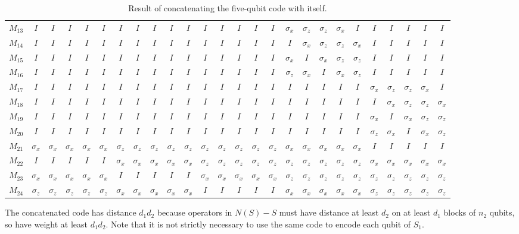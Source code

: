 \documentclass{report}
\newcommand{\X}{\sigma_x}
\newcommand{\Z}{\sigma_z}
\begin{document}
\begin{table}
{\begin{tabular}{c|ccccc|ccccc|ccccc|ccccc|ccccc}
$M_{13}$ & $I$ & $I$ & $I$ & $I$ & $I$ & $I$ & $I$ & $I$ & $I$ & $I$ & $I$ 
& $I$ & $I$ & $I$ & $I$ & $\X$ & $\Z$ & $\Z$ & $\X$ & $I$ & $I$ & $I$ & 
$I$ & $I$ & $I$ \\
$M_{14}$ & $I$ & $I$ & $I$ & $I$ & $I$ & $I$ & $I$ & $I$ & $I$ & $I$ & $I$ 
& $I$ & $I$ & $I$ & $I$ & $I$ & $\X$ & $\Z$ & $\Z$ & $\X$ & $I$ & $I$ & 
$I$ & $I$ & $I$ \\
$M_{15}$ & $I$ & $I$ & $I$ & $I$ & $I$ & $I$ & $I$ & $I$ & $I$ & $I$ & $I$ 
& $I$ & $I$ & $I$ & $I$ & $\X$ & $I$ & $\X$ & $\Z$ & $\Z$ & $I$ & $I$ & 
$I$ & $I$ & $I$ \\
$M_{16}$ & $I$ & $I$ & $I$ & $I$ & $I$ & $I$ & $I$ & $I$ & $I$ & $I$ & $I$ 
& $I$ & $I$ & $I$ & $I$ & $\Z$ & $\X$ & $I$ & $\X$ & $\Z$ & $I$ & $I$ & 
$I$ & $I$ & $I$ \\
$M_{17}$ & $I$ & $I$ & $I$ & $I$ & $I$ & $I$ & $I$ & $I$ & $I$ & $I$ & $I$ 
& $I$ & $I$ & $I$ & $I$ & $I$ & $I$ & $I$ & $I$ & $I$ & $\X$ & $\Z$ & 
$\Z$ & $\X$ & $I$ \\
$M_{18}$ & $I$ & $I$ & $I$ & $I$ & $I$ & $I$ & $I$ & $I$ & $I$ & $I$ & $I$ 
& $I$ & $I$ & $I$ & $I$ & $I$ & $I$ & $I$ & $I$ & $I$ & $I$ & $\X$ & $\Z$ 
& $\Z$ & $\X$ \\
$M_{19}$ & $I$ & $I$ & $I$ & $I$ & $I$ & $I$ & $I$ & $I$ & $I$ & $I$ & $I$ 
& $I$ & $I$ & $I$ & $I$ & $I$ & $I$ & $I$ & $I$ & $I$ & $\X$ & $I$ & 
$\X$ & $\Z$ & $\Z$ \\
$M_{20}$ & $I$ & $I$ & $I$ & $I$ & $I$ & $I$ & $I$ & $I$ & $I$ & $I$ & $I$ 
& $I$ & $I$ & $I$ & $I$ & $I$ & $I$ & $I$ & $I$ & $I$ & $\Z$ & $\X$ & $I$ 
& $\X$ & $\Z$ \\
$M_{21}$ & $\X$ & $\X$ & $\X$ & $\X$ & $\X$ & $\Z$ & $\Z$ & $\Z$ & $\Z$ 
& $\Z$ & $\Z$ & $\Z$ & $\Z$ & $\Z$ & $\Z$ & $\X$ & $\X$ & $\X$ & $\X$ & 
$\X$ & $I$ & $I$ & $I$ & $I$ & $I$ \\
$M_{22}$ & $I$ & $I$ & $I$ & $I$ & $I$ & $\X$ & $\X$ & $\X$ & $\X$ & 
$\X$ & $\Z$ & $\Z$ & $\Z$ & $\Z$ & $\Z$ & $\Z$ & $\Z$ & $\Z$ & $\Z$ & 
$\Z$ & $\X$ & $\X$ & $\X$ & $\X$ & $\X$ \\
$M_{23}$ & $\X$ & $\X$ & $\X$ & $\X$ & $\X$ & $I$ & $I$ & $I$ & $I$ & 
$I$ & $\X$ & $\X$ & $\X$ & $\X$ & $\X$ & $\Z$ & $\Z$ & $\Z$ & $\Z$ & 
$\Z$ & $\Z$ & $\Z$ & $\Z$ & $\Z$ & $\Z$ \\
$M_{24}$ & $\Z$ & $\Z$ & $\Z$ & $\Z$ & $\Z$ & $\X$ & $\X$ & $\X$ & $\X$ 
& $\X$ & $I$ & $I$ & $I$ & $I$ & $I$ & $\X$ & $\X$ & $\X$ & $\X$ & $\X$ 
& $\Z$ & $\Z$ & $\Z$ & $\Z$ & $\Z$
\end{tabular}
\caption{Result of concatenating the five-qubit code with itself.}
\label{table-25qubit}}
\end{table}
The concatenated code has distance $d_1 d_2$ because operators in $N(S) - 
S$ must have distance at least $d_2$ on at least $d_1$ blocks of $n_2$ 
qubits, so have weight at least $d_1 d_2$.  Note that it is not strictly 
necessary to use the same code to encode each qubit of $S_1$.
\end{document}
